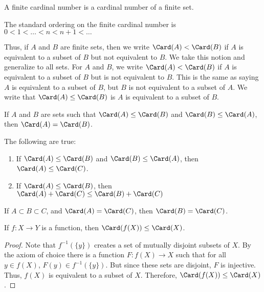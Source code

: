         \begin{definition}
            A finite cardinal number is a cardinal
            number of a finite set.
        \end{definition}
        \begin{definition}
            The standard ordering on the finite cardinal
            number is $0<1<\hdots<n<n+1<\hdots$
        \end{definition}
        Thus, if $A$ and $B$ are finite sets, then we write
        $\Card(A)<\Card(B)$ if $A$ is equivalent to a
        subset of $B$ but not equivalent to $B$.
        We take this notion and generalize to
        all sets. For $A$ and $B$, we write
        $\Card(A)<\Card(B)$ if $A$ is equivalent to a subset
        of $B$ but is not equivalent to $B$. This is the
        same as saying $A$ is equivalent to a subset of $B$,
        but $B$ is not equivalent to a subset of $A$.
        We write that
        $\Card(A)\leq\Card(B)$ is $A$ is equivalent to a
        subset of $B$.
        \begin{theorem}
            If $A$ and $B$ are sets such that
            $\Card(A)\leq\Card(B)$ and
            $\Card(B)\leq\Card(A)$, then
            $\Card(A)=\Card(B)$.
        \end{theorem}
        \begin{theorem}
            The following are true:
            \begin{enumerate}
                \item If $\Card(A)\leq\Card(B)$ and
                      $\Card(B)\leq\Card(A)$, then
                      $\Card(A)\leq\Card(C)$.
                \item If $\Card(A)\leq\Card(B)$, then
                      $\Card(A)+\Card(C)\leq\Card(B)+\Card(C)$
            \end{enumerate}
        \end{theorem}
        \begin{theorem}
            If ${A}\subset{B}\subset{C}$, and
            $\Card(A)=\Card(C)$, then $\Card(B)=\Card(C)$.
        \end{theorem}
        \begin{theorem}
            If $f:{X}\rightarrow{Y}$ is a function,
            then $\Card(f(X))\leq\Card(X)$.
        \end{theorem}
        \begin{proof}
            Note that $f^{-1}(\{y\})$ creates a set of mutually disjoint
            subsets of $X$. By the axiom of choice there is a function
            $F:{f(X)}\rightarrow{X}$ such that for all ${y}\in{f(X)}$,
            ${F(y)}\in{f^{-1}(\{y\})}$. But since these sets are disjoint,
            $F$ is injective. Thus, $f(X)$ is equivalent to a subset of $X$.
            Therefore, $\Card(f(X))\leq\Card(X)$.
        \end{proof}
